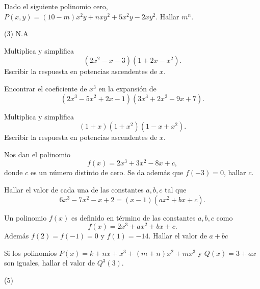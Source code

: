 \begin{multicols}{2}
    \begin{exercise}
        Dado el siguiente polinomio cero, $P(x, y) = (10 - m)x^2 y + nxy^2 + 5x^2 y - 2xy^2$.
        Hallar $m^n$.
        \begin{tasks}(3)
        \task N.A
        \end{tasks}
    \end{exercise}

    \begin{exercise}
        Multiplica y simplifica
        \[
            (2x^2 - x - 3)(1 + 2x - x^2).
        \]
        Escribir la respuesta en potencias ascendentes de $x$.
    \end{exercise}

    \begin{exercise}
        Encontrar el coeficiente de $x^3$ en la expansión de
        \[
            (2x^3 - 5x^2 + 2x - 1)(3x^3 + 2x^2 - 9x + 7).
        \]
    \end{exercise}

    \begin{exercise}
        Multiplica y simplifica
        \[
            (1 + x)(1 + x^2)(1 - x + x^2).
        \]
        Escribir la respuesta en potencias ascendentes de $x$.
    \end{exercise}

    \begin{exercise}
        Nos dan el polinomio
        \[
            f(x) = 2x^3 + 3x^2 - 8x + c,
        \]
        donde $c$ es un número distinto de cero.
        Se da además que $f(-3) = 0$, hallar $c$.
    \end{exercise}

    \begin{exercise}
        Hallar el valor de cada una de las constantes $a, b, c$ tal que
        \[
            6x^3 - 7x^2 - x + 2 = (x - 1)(ax^2 + bx + c).
        \]
    \end{exercise}

    \begin{exercise}
        Un polinomio $f(x)$ es definido en término de las constantes $a, b, c$ como
        \[
            f(x) = 2x^3 + ax^2 + bx + c.
        \]
        Además $f(2) = f(-1) = 0$ y $f(1) = -14$.
        Hallar el valor de $a + bc$
    \end{exercise}

    \begin{exercise}
        Si los polinomios $P(x) = k + nx + x^3 + (m + n)x^2 + mx^3$ y $Q(x) = 3 + ax$ son iguales, hallar el valor de $Q^3(3)$.
        \begin{tasks}(5)
        \end{tasks}
    \end{exercise}


\end{multicols}
